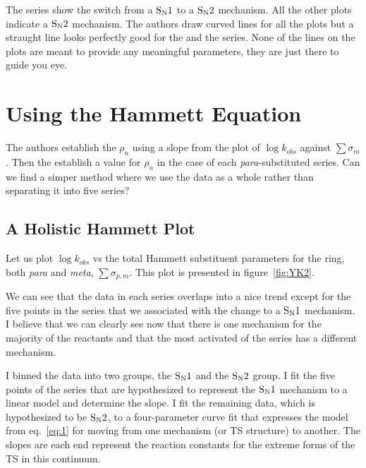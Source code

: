 \documentclass{tufte-handout}
\begin{document}
The  series show the switch from a $\rm S_N1$ to a $\rm S_N2$ mechanism. All the other plots indicate a $\rm S_N2$ mechanism. The authors draw curved lines for all the plots but a straught line looks perfectly good for the  and the  series. None of the lines on the plots are meant to provide any meaningful parameters, they are just there to guide you eye.

\section{Using the Hammett Equation}

The authors establish the $\rho_n$ using a slope from the plot of $\log{k_{obs}}$ against $\sum \sigma_m$. Then the establish a value for $\rho_n$ in the case of each \textit{para}-substituted series. Can we find a simper method where we use the data as a whole rather than separating it into five series?

\subsection{A Holistic Hammett Plot}

Let us plot $\log{k_{obs}}$ vs the total Hammett substituent parameters for the ring, both \textit{para} and  \textit{meta}, $\sum \sigma_{p,m}$. This plot is presented in figure~\vref{fig:YK2}.

We can see that the data in each series overlaps into a nice trend except for the five points in the  series that we associated with the change to a $\rm S_N1$ mechanism. I believe that we can clearly see now that there is one mechanism for the majority of the reactants and that the most activated of the  series has a different mechanism.

I binned the data into two groups, the $\rm S_N1$ and the $\rm S_N2$ group. I fit the five points of the  series that are hypothesized to represent the $\rm S_N1$ mechanism to a linear model and determine the slope. I fit the remaining data, which is hypothesized to be $\rm S_N2$, to a four-parameter curve fit that expresses the model from eq.~\vref{eq:1} for moving from one mechanism (or TS structure) to another. The slopes are each end represent the reaction constants for the extreme forms of the TS in this continuum. 
\end{document}
